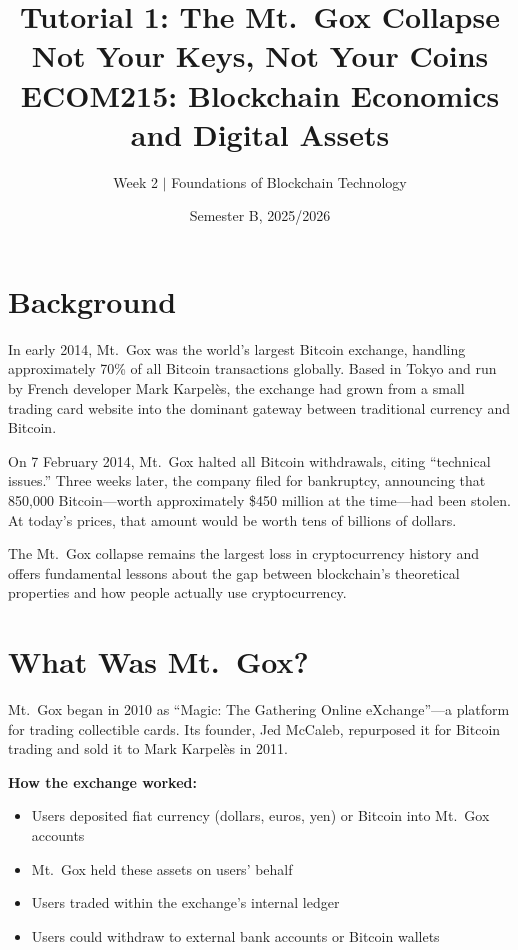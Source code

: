 \documentclass[11pt]{article}
\title{Tutorial 1: The Mt.\ Gox Collapse\\[0.3em] \Large Not Your Keys, Not Your Coins\\[1em] \normalsize ECOM215: Blockchain Economics and Digital Assets}
\author{Week 2 $\vert$ Foundations of Blockchain Technology}
\date{Semester B, 2025/2026}
\begin{document}
\maketitle

\vspace{1em}
\begin{center}
\end{center}

\section*{Background}

In early 2014, Mt.\ Gox was the world's largest Bitcoin exchange, handling approximately 70\% of all Bitcoin transactions globally. Based in Tokyo and run by French developer Mark Karpelès, the exchange had grown from a small trading card website into the dominant gateway between traditional currency and Bitcoin.

On 7 February 2014, Mt.\ Gox halted all Bitcoin withdrawals, citing ``technical issues.'' Three weeks later, the company filed for bankruptcy, announcing that 850,000 Bitcoin---worth approximately \$450 million at the time---had been stolen. At today's prices, that amount would be worth tens of billions of dollars.

The Mt.\ Gox collapse remains the largest loss in cryptocurrency history and offers fundamental lessons about the gap between blockchain's theoretical properties and how people actually use cryptocurrency.

\section*{What Was Mt.\ Gox?}

Mt.\ Gox began in 2010 as ``Magic: The Gathering Online eXchange''---a platform for trading collectible cards. Its founder, Jed McCaleb, repurposed it for Bitcoin trading and sold it to Mark Karpelès in 2011.

\medskip
\noindent\textbf{How the exchange worked:}
\begin{itemize}[leftmargin=*]
\item Users deposited fiat currency (dollars, euros, yen) or Bitcoin into Mt.\ Gox accounts
\item Mt.\ Gox held these assets on users' behalf
\item Users traded within the exchange's internal ledger
\item Users could withdraw to external bank accounts or Bitcoin wallets
\end{itemize}
\end{document}

